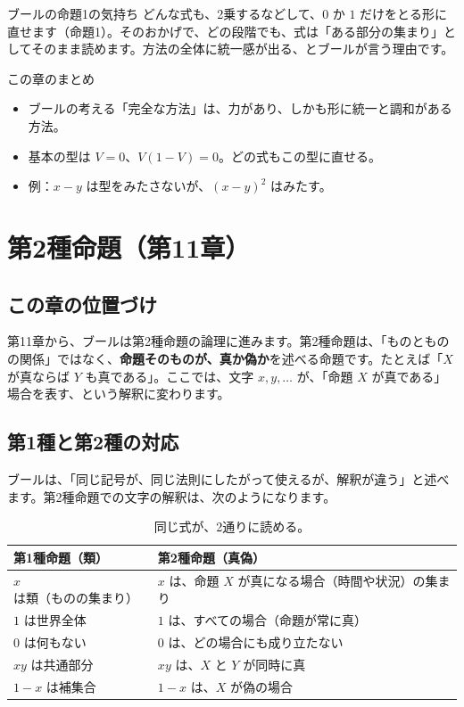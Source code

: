 \documentclass[a4paper,11pt,openany]{ltjsbook}
\begin{document}
\begin{notebox}{ブールの命題1の気持ち}
どんな式も、2乗するなどして、$0$ か $1$ だけをとる形に直せます（命題1）。そのおかげで、どの段階でも、式は「ある部分の集まり」としてそのまま読めます。方法の全体に統一感が出る、とブールが言う理由です。
\end{notebox}

\begin{pointbox}{この章のまとめ}
\begin{itemize}[leftmargin=*]
\item ブールの考える「完全な方法」は、力があり、しかも形に統一と調和がある方法。
\item 基本の型は $V=0$、$V(1-V)=0$。どの式もこの型に直せる。
\item 例：$x-y$ は型をみたさないが、$(x-y)^2$ はみたす。
\end{itemize}
\end{pointbox}

\chapter{第2種命題（第11章）}

\section{この章の位置づけ}

第11章から、ブールは第2種命題の論理に進みます。第2種命題は、「ものとものの関係」ではなく、\textbf{命題そのものが、真か偽か}を述べる命題です。たとえば「$X$ が真ならば $Y$ も真である」。ここでは、文字 $x,y,\ldots$ が、「命題 $X$ が真である」場合を表す、という解釈に変わります。

\section{第1種と第2種の対応}

ブールは、「同じ記号が、同じ法則にしたがって使えるが、解釈が違う」と述べます。第2種命題での文字の解釈は、次のようになります。

\begin{table}[htbp]
\centering
\small
\begin{tabular}{p{5.2cm}p{5.2cm}}
\toprule
第1種命題（類） & 第2種命題（真偽）\\
\midrule
$x$ は類（ものの集まり） & $x$ は、命題 $X$ が真になる場合（時間や状況）の集まり\\
$1$ は世界全体 & $1$ は、すべての場合（命題が常に真）\\
$0$ は何もない & $0$ は、どの場合にも成り立たない\\
$xy$ は共通部分 & $xy$ は、$X$ と $Y$ が同時に真\\
$1-x$ は補集合 & $1-x$ は、$X$ が偽の場合\\
\bottomrule
\end{tabular}
\caption{同じ式が、2通りに読める。}
\end{table}
\end{document}
